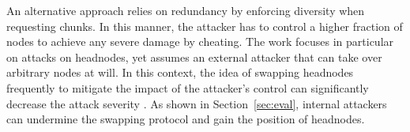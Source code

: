 An alternative approach \cite{nguyen2014resilience} relies on redundancy by enforcing diversity when requesting chunks. 
In this manner, the attacker has to control a higher fraction of nodes to achieve any severe damage by cheating.
The work focuses in particular on attacks on headnodes, yet assumes an external attacker that can take over arbitrary nodes at will.
In this context, the idea of swapping headnodes frequently to mitigate the impact of the attacker's control can significantly decrease the attack severity \cite{nguyen2016swap}.
As shown in Section~\ref{sec:eval}, internal attackers can undermine the swapping protocol and gain the position of headnodes.  






